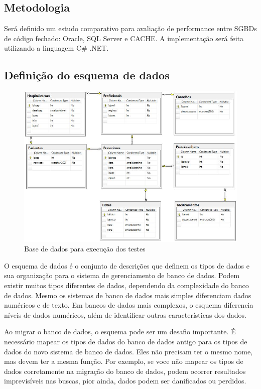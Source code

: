 \subsection{Metodologia}
\label{cha:subsecmetodologia}

Será definido um estudo comparativo para avaliação de performance entre SGBDs de código fechado: Oracle, SQL Server e CACHE. A implementação será feita utilizando a linguagem C{\#} .NET.

\subsection{Definição do esquema de dados}
\label{cha:sub1esquema}


\begin{figure}[ht!]
	\begin{center}
		\includegraphics[scale=0.7]{esquema2.jpg}
		\caption{\label{esquema} Base de dados para execução dos testes}		
	\end{center}
\end{figure}


O esquema de dados é o conjunto de descrições que definem os tipos de dados e sua organização para o sistema de gerenciamento de banco de dados. Podem existir muitos tipos diferentes de dados, dependendo da complexidade do banco de dados.
Mesmo os sistemas de banco de dados mais simples diferenciam dados numéricos e de texto. Em bancos de dados mais
complexos, o esquema diferencia níveis de dados numéricos, além de identificar outras características dos dados.

Ao migrar o banco de dados, o esquema pode ser um desafio importante. É necessário mapear os tipos de dados do banco
de dados antigo para os tipos de dados do novo sistema de banco de dados. Eles não precisam ter o mesmo nome, mas
devem ter a mesma função. Por exemplo, se voce não mapear os tipos de dados corretamente na migração do banco de dados, podem ocorrer resultados imprevisíveis nas buscas, pior ainda, dados podem ser danificados ou perdidos.


